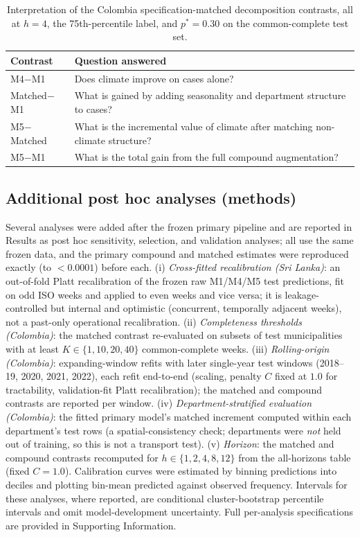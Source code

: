 \documentclass[11pt,a4paper]{article}
\begin{document}
\begin{table}[H]
\centering
\caption{Interpretation of the Colombia specification-matched decomposition contrasts, all at $h=4$, the 75th-percentile label, and $p^*=0.30$ on the common-complete test set.}
\label{tab:contrastq}
\begin{tabular}{ll}
\toprule
Contrast & Question answered \\
\midrule
M4$-$M1 & Does climate improve on cases alone? \\
Matched$-$M1 & What is gained by adding seasonality and department structure to cases? \\
M5$-$Matched & What is the incremental value of climate after matching non-climate structure? \\
M5$-$M1 & What is the total gain from the full compound augmentation? \\
\bottomrule
\end{tabular}
\end{table}


\subsection{Additional post hoc analyses (methods)}
Several analyses were added after the frozen primary pipeline and are reported in Results as post hoc sensitivity, selection, and validation analyses; all use the same frozen data, and the primary compound and matched estimates were reproduced exactly (to $<0.0001$) before each. (i) \emph{Cross-fitted recalibration (Sri Lanka)}: an out-of-fold Platt recalibration of the frozen raw M1/M4/M5 test predictions, fit on odd ISO weeks and applied to even weeks and vice versa; it is leakage-controlled but internal and optimistic (concurrent, temporally adjacent weeks), not a past-only operational recalibration. (ii) \emph{Completeness thresholds (Colombia)}: the matched contrast re-evaluated on subsets of test municipalities with at least $K\in\{1,10,20,40\}$ common-complete weeks. (iii) \emph{Rolling-origin (Colombia)}: expanding-window refits with later single-year test windows (2018--19, 2020, 2021, 2022), each refit end-to-end (scaling, penalty $C$ fixed at $1.0$ for tractability, validation-fit Platt recalibration); the matched and compound contrasts are reported per window. (iv) \emph{Department-stratified evaluation (Colombia)}: the fitted primary model's matched increment computed within each department's test rows (a spatial-consistency check; departments were \emph{not} held out of training, so this is not a transport test). (v) \emph{Horizon}: the matched and compound contrasts recomputed for $h\in\{1,2,4,8,12\}$ from the all-horizons table (fixed $C=1.0$). Calibration curves were estimated by binning predictions into deciles and plotting bin-mean predicted against observed frequency. Intervals for these analyses, where reported, are conditional cluster-bootstrap percentile intervals and omit model-development uncertainty. Full per-analysis specifications are provided in Supporting Information.
\end{document}

